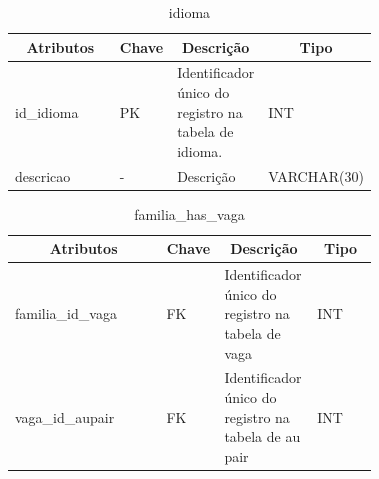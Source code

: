 \begin{enumerate}
    \begin{table}[H]
    \caption{idioma}
    \label{idioma}
    	\centering\footnotesize
        \begin{tabular}{|p{0.40\linewidth} | p{0.04\linewidth} |  p{0.12\linewidth} | p{0.16\linewidth} |}  \hline
        \multicolumn{1}{|c|}{\textbf{Atributos}} &
        \multicolumn{1}{|c|}{\textbf{Chave}} &
        \multicolumn{1}{c|}{\textbf{Descrição}} &
        \multicolumn{1}{c|}{\textbf{Tipo}} \\ \hline
          
        id\_idioma  &  
        PK & 
        Identificador único do registro na tabela de idioma. &
        INT
        \\  \hline
        
        descricao & 
        - & 
        Descrição &
        VARCHAR(30)
        \\ \hline
       
        \end{tabular}
    \end{table}
\end{enumerate}

\begin{enumerate}
    \begin{table}[H]
    \caption{familia\_has\_vaga}
    \label{idioma}
    	\centering\footnotesize
        \begin{tabular}{|p{0.40\linewidth} | p{0.04\linewidth} |  p{0.12\linewidth} | p{0.16\linewidth} |}  \hline
        \multicolumn{1}{|c|}{\textbf{Atributos}} &
        \multicolumn{1}{|c|}{\textbf{Chave}} &
        \multicolumn{1}{c|}{\textbf{Descrição}} &
        \multicolumn{1}{c|}{\textbf{Tipo}} \\ \hline
          
        familia\_id\_vaga  &  
        FK & 
        Identificador único do registro na tabela de vaga &
        INT
        \\  \hline
        
        vaga\_id\_aupair  &  
        FK & 
        Identificador único do registro na tabela de au pair &
        INT
        \\  \hline
       
        \end{tabular}
    \end{table}
\end{enumerate}

